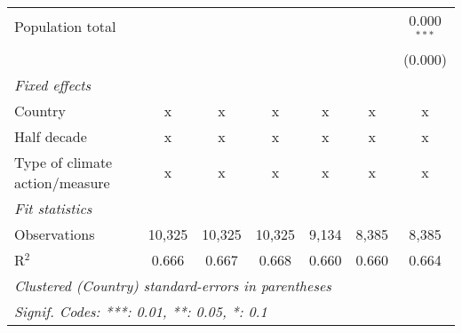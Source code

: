 \begin{tabular}{lcccccc}
   Population total                                                      &         &                &                &                &                & 0.000$^{***}$\\   
                                                                         &         &                &                &                &                & (0.000)\\   
   \emph{Fixed effects}\\
   Country                                                               & x       & x              & x              & x              & x              & x\\  
   Half decade                                                           & x       & x              & x              & x              & x              & x\\  
   Type of climate action/measure                                        & x       & x              & x              & x              & x              & x\\  
   \midrule \emph{Fit statistics}\\
   Observations                                                          & 10,325  & 10,325         & 10,325         & 9,134          & 8,385          & 8,385\\  
   R$^2$                                                                 & 0.666   & 0.667          & 0.668          & 0.660          & 0.660          & 0.664\\  
   \midrule
   \multicolumn{7}{l}{\emph{Clustered (Country) standard-errors in parentheses}}\\
   \multicolumn{7}{l}{\emph{Signif. Codes: ***: 0.01, **: 0.05, *: 0.1}}\\
\end{tabular}
\par\endgroup


